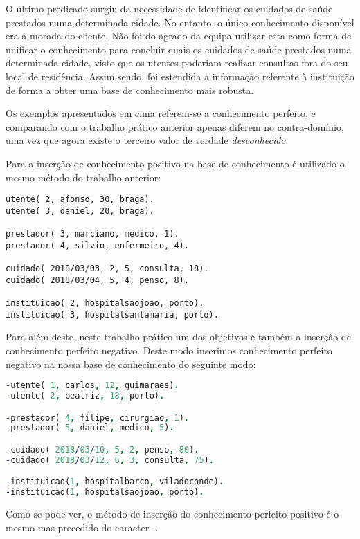 \documentclass[a4paper]{article}
\begin{document}
O último predicado surgiu da necessidade de identificar os cuidados de saúde prestados numa determinada cidade. No entanto, o único conhecimento disponível era a morada do cliente. Não foi do agrado da equipa utilizar esta como forma de unificar o conhecimento para concluir quais os cuidados de saúde prestados numa determinada cidade, visto que os utentes poderiam realizar consultas fora do seu local de residência. Assim sendo, foi estendida a informação referente à instituição de forma a obter uma base de conhecimento mais robusta.

Os exemplos apresentados em cima referem-se a conhecimento perfeito, e comparando com o trabalho prático anterior apenas diferem no contra-domínio, uma vez que agora existe o terceiro valor de verdade \emph{desconhecido}.

Para a inserção de conhecimento positivo na base de conhecimento é utilizado o mesmo método do trabalho anterior:

\begin{lstlisting}
utente( 2, afonso, 30, braga).
utente( 3, daniel, 20, braga).

prestador( 3, marciano, medico, 1).
prestador( 4, silvio, enfermeiro, 4).

cuidado( 2018/03/03, 2, 5, consulta, 18).
cuidado( 2018/03/04, 5, 4, penso, 8).

instituicao( 2, hospitalsaojoao, porto).
instituicao( 3, hospitalsantamaria, porto).
\end{lstlisting}

Para além deste, neste trabalho prático um dos objetivos é também a inserção de conhecimento perfeito negativo. Deste modo inserimos conhecimento perfeito negativo na nossa base de conhecimento do seguinte modo: 

\begin{lstlisting}[language=Prolog, caption=Factos negativos relativos ao utente.]
-utente( 1, carlos, 12, guimaraes).
-utente( 2, beatriz, 18, porto).

-prestador( 4, filipe, cirurgiao, 1).
-prestador( 5, daniel, medico, 5).

-cuidado( 2018/03/10, 5, 2, penso, 80).
-cuidado( 2018/03/12, 6, 3, consulta, 75).

-instituicao(1, hospitalbarco, viladoconde).
-instituicao(1, hospitalsaojoao, porto).
\end{lstlisting}

Como se pode ver, o método de inserção do conhecimento perfeito positivo é o mesmo mas precedido do caracter \emph{-}.
\end{document}
